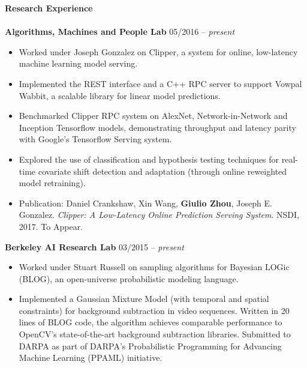 \documentclass{article}
\begin{document}
\noindent
\textbf{{\Large Research Experience}}\\[-2mm]
\HRule\\
\noindent
\textbf{Algorithms, Machines and People Lab}
\hfill 05/2016 -- \textit{present}
\begin{itemize}
\vspace{-2.5mm}
\item Worked under Joseph Gonzalez on Clipper, a system for online, low-latency machine learning model serving.
\vspace{-2.5mm}
\item Implemented the REST interface and a C++ RPC server to support Vowpal Wabbit, a scalable library for linear model predictions.
\vspace{-2.5mm}
\item Benchmarked Clipper RPC system on AlexNet, Network-in-Network and Inception Tensorflow models, demonstrating throughput and latency parity with Google's Tensorflow Serving system.
\vspace{-2.5mm}
\item Explored the use of classification and hypothesis testing techniques for real-time covariate shift detection and adaptation (through online reweighted model retraining).
\vspace{-2.5mm}
\item Publication: Daniel Crankshaw, Xin Wang, \textbf{Giulio Zhou}, Joseph E. Gonzalez. \textit{Clipper: A Low-Latency Online Prediction Serving System}. NSDI, 2017. To Appear.
\end{itemize}
\vspace{-2mm}

\noindent
\textbf{Berkeley AI Research Lab}
\hfill 03/2015 -- \textit{present}
\begin{itemize}
\vspace{-2.5mm}
\item Worked under Stuart Russell on sampling algorithms for Bayesian LOGic (BLOG), an open-universe probabilistic modeling language.
\vspace{-2.5mm}
\item Implemented a Gaussian Mixture Model (with temporal and spatial constraints) for background subtraction in video sequences. Written in 20 lines of BLOG code, the algorithm achieves comparable performance to OpenCV's state-of-the-art background subtraction libraries. Submitted to DARPA as part of DARPA's Probabilistic Programming for Advancing Machine Learning (PPAML) initiative.
\end{itemize}
\end{document}
